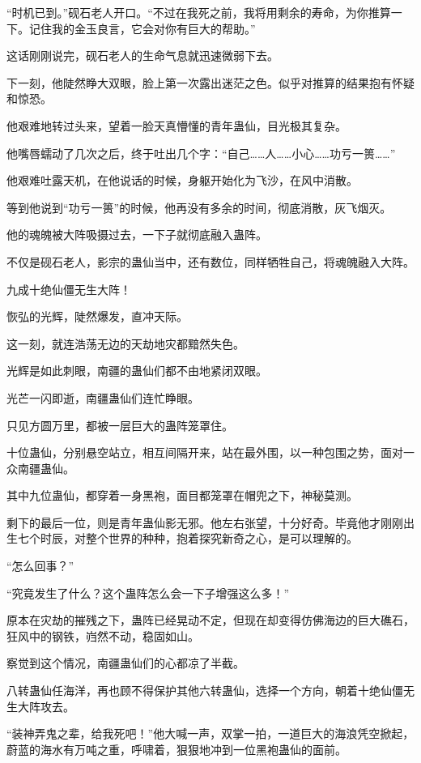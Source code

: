 \begin{this_body}
“时机已到。”砚石老人开口。“不过在我死之前，我将用剩余的寿命，为你推算一下。记住我的金玉良言，它会对你有巨大的帮助。”

这话刚刚说完，砚石老人的生命气息就迅速微弱下去。

下一刻，他陡然睁大双眼，脸上第一次露出迷茫之色。似乎对推算的结果抱有怀疑和惊恐。

他艰难地转过头来，望着一脸天真懵懂的青年蛊仙，目光极其复杂。

他嘴唇蠕动了几次之后，终于吐出几个字：“自己……人……小心……功亏一篑……”

他艰难吐露天机，在他说话的时候，身躯开始化为飞沙，在风中消散。

等到他说到“功亏一篑”的时候，他再没有多余的时间，彻底消散，灰飞烟灭。

他的魂魄被大阵吸摄过去，一下子就彻底融入蛊阵。

不仅是砚石老人，影宗的蛊仙当中，还有数位，同样牺牲自己，将魂魄融入大阵。

九成十绝仙僵无生大阵！

恢弘的光辉，陡然爆发，直冲天际。

这一刻，就连浩荡无边的天劫地灾都黯然失色。

光辉是如此刺眼，南疆的蛊仙们都不由地紧闭双眼。

光芒一闪即逝，南疆蛊仙们连忙睁眼。

只见方圆万里，都被一层巨大的蛊阵笼罩住。

十位蛊仙，分别悬空站立，相互间隔开来，站在最外围，以一种包围之势，面对一众南疆蛊仙。

其中九位蛊仙，都穿着一身黑袍，面目都笼罩在帽兜之下，神秘莫测。

剩下的最后一位，则是青年蛊仙影无邪。他左右张望，十分好奇。毕竟他才刚刚出生七个时辰，对整个世界的种种，抱着探究新奇之心，是可以理解的。

“怎么回事？”

“究竟发生了什么？这个蛊阵怎么会一下子增强这么多！”

原本在灾劫的摧残之下，蛊阵已经晃动不定，但现在却变得仿佛海边的巨大礁石，狂风中的钢铁，岿然不动，稳固如山。

察觉到这个情况，南疆蛊仙们的心都凉了半截。

八转蛊仙任海洋，再也顾不得保护其他六转蛊仙，选择一个方向，朝着十绝仙僵无生大阵攻去。

“装神弄鬼之辈，给我死吧！”他大喊一声，双掌一拍，一道巨大的海浪凭空掀起，蔚蓝的海水有万吨之重，呼啸着，狠狠地冲到一位黑袍蛊仙的面前。


\end{this_body}
